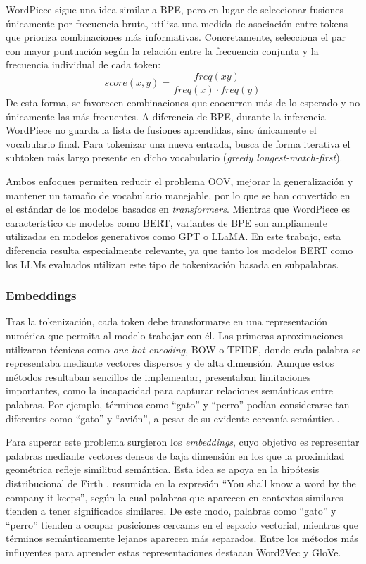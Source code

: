 WordPiece \cite{schuster_japanese_2012} sigue una idea similar a \ac{BPE}, pero en lugar de seleccionar fusiones únicamente por frecuencia bruta, utiliza una medida de asociación entre tokens que prioriza combinaciones más informativas. Concretamente, selecciona el par con mayor puntuación según la relación entre la frecuencia conjunta y la frecuencia individual de cada token:
\begin{equation*}
	score(x,y)=\frac{freq(xy)}{freq(x)\cdot freq(y)}
\end{equation*}
De esta forma, se favorecen combinaciones que coocurren más de lo esperado y no únicamente las más frecuentes. A diferencia de \ac{BPE}, durante la inferencia WordPiece no guarda la lista de fusiones aprendidas, sino únicamente el vocabulario final. Para tokenizar una nueva entrada, busca de forma iterativa el subtoken más largo presente en dicho vocabulario (\textit{greedy longest-match-first}).

Ambos enfoques permiten reducir el problema \acs{OOV}, mejorar la generalización y mantener un tamaño de vocabulario manejable, por lo que se han convertido en el estándar de los modelos basados en \textit{transformers}. Mientras que WordPiece es característico de modelos como \ac{BERT}, variantes de \ac{BPE} son ampliamente utilizadas en modelos generativos como \acs{GPT} o LLaMA. En este trabajo, esta diferencia resulta especialmente relevante, ya que tanto los modelos \ac{BERT} como los \acp{LLM} evaluados utilizan este tipo de tokenización basada en subpalabras.

\subsubsection{Embeddings}

Tras la tokenización, cada token debe transformarse en una representación numérica que permita al modelo trabajar con él. Las primeras aproximaciones utilizaron técnicas como \textit{one-hot encoding}, \ac{BOW} o \ac{TFIDF}, donde cada palabra se representaba mediante vectores dispersos y de alta dimensión. Aunque estos métodos resultaban sencillos de implementar, presentaban limitaciones importantes, como la incapacidad para capturar relaciones semánticas entre palabras. Por ejemplo, términos como “gato” y “perro” podían considerarse tan diferentes como “gato” y “avión”, a pesar de su evidente cercanía semántica .

Para superar este problema surgieron los \textit{embeddings}, cuyo objetivo es representar palabras mediante vectores densos de baja dimensión en los que la proximidad geométrica refleje similitud semántica. Esta idea se apoya en la hipótesis distribucional de Firth \cite{firth_synopsis_1957}, resumida en la expresión “You shall know a word by the company it keeps”, según la cual palabras que aparecen en contextos similares tienden a tener significados similares. De este modo, palabras como “gato” y “perro” tienden a ocupar posiciones cercanas en el espacio vectorial, mientras que términos semánticamente lejanos aparecen más separados. 
Entre los métodos más influyentes para aprender estas representaciones destacan Word2Vec y GloVe.

